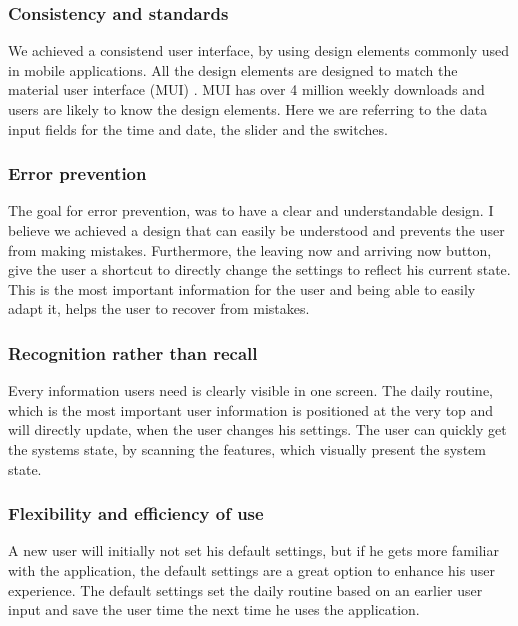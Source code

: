 \documentclass[]{interact}
\theoremstyle{plain}%
\theoremstyle{definition}
\theoremstyle{remark}
\begin{document}
\subsubsection*{Consistency and standards}

We achieved a consistend user interface, by using design elements commonly used in mobile applications. All the design elements are designed to match the material user interface (MUI) \citep*{noauthor_about_nodate}. MUI has over 4 million weekly downloads and users are likely to know the design elements. Here we are referring to the data input fields for the time and date, the slider and the switches.

\subsubsection*{Error prevention}

The goal for error prevention, was to have a clear and understandable design. I believe we achieved a design that can easily be understood and prevents the user from making mistakes. Furthermore, the leaving now and arriving now button, give the user a shortcut to directly change the settings to reflect his current state. This is the most important information for the user and being able to easily adapt it, helps the user to recover from mistakes.


\subsubsection*{Recognition rather than recall}

Every information users need is clearly visible in one screen. The daily routine, which is the most important user information is positioned at the very top and will directly update, when the user changes his settings.
The user can quickly get the systems state, by scanning the features, which visually present the system state.


\subsubsection*{Flexibility and efficiency of use}

A new user will initially not set his default settings, but if he gets more familiar with the application, the default settings are a great option to enhance his user experience. The default settings set the daily routine based on an earlier user input and save the user time the next time he uses the application.
\end{document}
